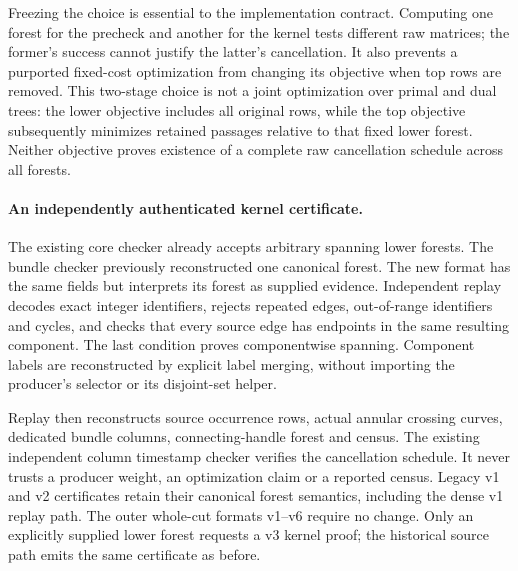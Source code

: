 Freezing the choice is essential to the implementation contract. Computing
one forest for the precheck and another for the kernel tests different raw
matrices; the former's success cannot justify the latter's cancellation.
It also prevents a purported fixed-cost optimization from changing its
objective when top rows are removed. This two-stage choice is not a joint
optimization over primal and dual trees: the lower objective includes all
original rows, while the top objective subsequently minimizes retained
passages relative to that fixed lower forest. Neither objective proves
existence of a complete raw cancellation schedule across all forests.

\paragraph{An independently authenticated kernel certificate.}
The existing core checker already accepts arbitrary spanning lower forests.
The bundle checker previously reconstructed one canonical forest. The new
 format has the same fields but interprets
its forest as supplied evidence. Independent replay decodes exact integer
identifiers, rejects repeated edges, out-of-range identifiers and cycles,
and checks that every source edge has endpoints in the same resulting
component. The last condition proves componentwise spanning. Component
labels are reconstructed by explicit label merging, without importing the
producer's selector or its disjoint-set helper.

Replay then reconstructs source occurrence rows, actual annular crossing
curves, dedicated bundle columns, connecting-handle forest and census.
The existing independent column timestamp checker verifies the cancellation
schedule. It never trusts a producer weight, an optimization claim or a
reported census. Legacy v1 and v2 certificates retain their canonical
forest semantics, including the dense v1 replay path. The outer whole-cut
formats v1--v6 require no change. Only an explicitly supplied lower forest
requests a v3 kernel proof; the historical source path emits the same
certificate as before.

